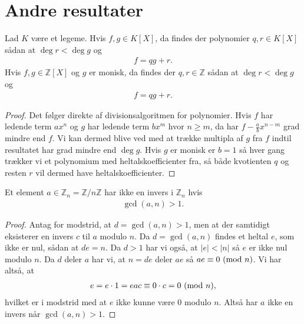 \section{Andre resultater}
\begin{thm}
\label{monic}
Lad $K$ være et legeme. Hvis $f, g \in K[X]$, da findes der polynomier $q, r \in K[X]$ sådan at $\deg r < \deg g$ og
\begin{align*}
	f = qg + r.
\end{align*}
Hvis $f, g \in \mathbb{Z}[X]$ og $g$ er monisk, da findes der $q, r \in \mathbb{Z}$ sådan at $\deg r < \deg g$ og
\begin{align*}
	f = qg + r.
\end{align*}
\end{thm}
\begin{proof}
Det følger direkte af divisionsalgoritmen for polynomier. Hvis $f$ har ledende term $ax^n$ og $g$ har ledende term $bx^m$ hvor $n \geq m$, da har $f - \frac{a}{b} x^{n-m}$ grad mindre end $f$. Vi kan dermed blive ved med at trække multipla af $g$ fra $f$ indtil resultatet har grad mindre end $\deg g$.
Hvis $g$ er monisk er $b=1$ så hver gang trækker vi et polynomium med heltalskoefficienter fra, så både kvotienten $q$ og resten $r$ vil dermed have heltalskoefficienter.
\end{proof}
\label{appendiks_andre}
\begin{proposition}
\label{inverse_exists_not}
Et element $a \in \mathbb{Z}_n = \mathbb{Z}/n\mathbb{Z}$ har ikke en invers i $\mathbb{Z}_n$ hvis 
\begin{align*}
	\gcd(a, n) > 1.
\end{align*}
\end{proposition}
\begin{proof}
Antag for modstrid, at $d = \gcd(a, n) > 1$, men at der samtidigt eksisterer en invers $c$ til $a$ modulo $n$. Da $d = \gcd(a, n)$ findes et heltal $e$, som ikke er nul, sådan at $de = n$. Da $d >1$ har vi også, at $|e| < |n|$ så $e$ er ikke nul modulo $n$. Da $d$ deler $a$ har vi, at $n = de$ deler $ae$ så $ae \equiv 0 \ (\mathrm{mod} \ n)$. Vi har altså, at
\begin{align*}
	e = e \cdot 1 = eac \equiv 0 \cdot c = 0 \ (\mathrm{mod} \ n),
\end{align*}
hvilket er i modstrid med at $e$ ikke kunne være $0$ modulo $n$. Altså har $a$ ikke en invers når $\gcd(a, n) > 1$.
\end{proof}